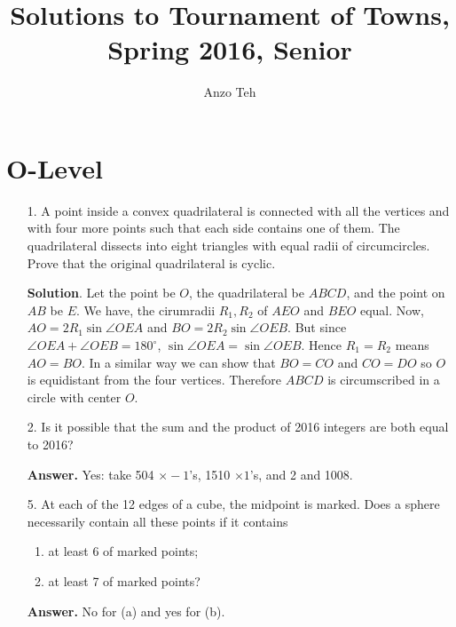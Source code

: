 \documentclass[11pt,a4paper]{article}
\begin{document}
\newcommand{\la}{\leftarrow}
\newcommand{\lra}{\leftrightarrow}
\newcommand{\bbN}{\mathbb{N}}
\newcommand{\bbZ}{\mathbb{Z}}
\newcommand{\dsum}{\displaystyle\sum}
\newcommand{\dprod}{\displaystyle\prod}


\title{Solutions to Tournament of Towns, Spring 2016, Senior}
\author{Anzo Teh}
\date{}
\maketitle

\section*{O-Level}
\begin{enumerate}
	\item[1.]
	A point inside a convex quadrilateral is connected with all the vertices
	and with four more points such that each side contains one of them. The
	quadrilateral dissects into eight triangles with equal radii of circumcircles.
	Prove that the original quadrilateral is cyclic.
	
	\textbf{Solution}. 
	Let the point be $O$, the quadrilateral be $ABCD$, and the point on $AB$ be $E$. 
	We have, the cirumradii $R_1, R_2$ of $AEO$ and $BEO$ equal. 
	Now, $AO=2R_1\sin \angle OEA$ and $BO=2R_2\sin\angle OEB$. 
	But since $\angle OEA+\angle OEB=180^{\circ}$, 
	$\sin\angle OEA=\sin\angle OEB$. 
	Hence $R_1=R_2$ means $AO=BO$. 
	In a similar way we can show that $BO=CO$ and $CO=DO$ so $O$ is equidistant from the four vertices. 
	Therefore $ABCD$ is circumscribed in a circle with center $O$. 
	
	\item[2.] 
	 Is it possible that the sum and the product of 2016 integers are both equal
	to 2016?
	
	\textbf{Answer.} Yes: take 504 $\times -1$'s, 1510 $\times 1$'s, and 2 and 1008. 
	
	\item[5.]At each of the 12 edges of a cube, the midpoint is marked. Does a sphere
	necessarily contain all these points if it contains
	
	\begin{enumerate}
		\item at least 6 of marked points;
		\item at least 7 of marked points?
	\end{enumerate}
    
    \textbf{Answer.} No for (a) and yes for (b). 
    

\end{enumerate}
\end{document}
